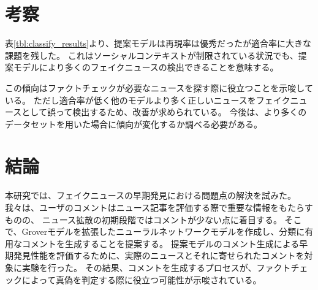 \documentclass[twocolumn, a4paper, uplatex]{UECIEresume}
\begin{document}
\section{考察}



表\ref{tbl:classify_results}より、提案モデルは再現率は優秀だったが適合率に大きな課題を残した。
これはソーシャルコンテキストが制限されている状況でも、提案モデルにより多くのフェイクニュースの検出できることを意味する。

この傾向はファクトチェックが必要なニュースを探す際に役立つことを示唆している。
ただし適合率が低く他のモデルより多く正しいニュースをフェイクニュースとして誤って検出するため、改善が求められている。
今後は、より多くのデータセットを用いた場合に傾向が変化するか調べる必要がある。


\section{結論}
本研究では、フェイクニュースの早期発見における問題点の解決を試みた。
我々は、ユーザのコメントはニュース記事を評価する際で重要な情報をもたらすものの、
ニュース拡散の初期段階ではコメントが少ない点に着目する。
そこで、Groverモデルを拡張したニューラルネットワークモデルを作成し、分類に有用なコメントを生成することを提案する。
提案モデルのコメント生成による早期発見性能を評価するために、実際のニュースとそれに寄せられたコメントを対象に実験を行った。
その結果、コメントを生成するプロセスが、ファクトチェックによって真偽を判定する際に役立つ可能性が示唆されている。

{\small


}
\end{document}
